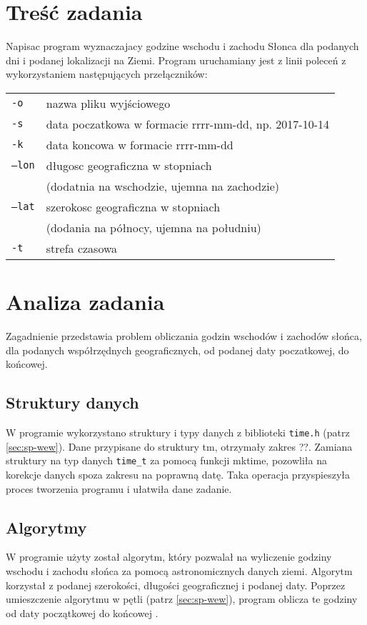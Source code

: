 \documentclass[12pt,a4paper]{article}
\begin{document}
\section{Treść zadania}
Napisac program wyznaczajacy godzine wschodu i zachodu Słonca dla podanych dni i podanej lokalizacji
na Ziemi.
Program uruchamiany jest z linii poleceń z wykorzystaniem następujących przełączników:
 
\begin{tabular}{ll}
\texttt{-o}  & nazwa pliku wyjściowego\\
\texttt{-s}  & data poczatkowa w formacie rrrr-mm-dd, np. 2017-10-14\\
\texttt{-k}  & data koncowa w formacie rrrr-mm-dd\\
\texttt{--lon}  & długosc geograficzna w stopniach\\
\texttt{} &(dodatnia na wschodzie, ujemna na zachodzie)\\
\texttt{--lat}  & szerokosc geograficzna w stopniach \\
\texttt{} &(dodania na północy, ujemna na południu)\\
\texttt{-t}  & strefa czasowa\\
\end{tabular}

\section{Analiza zadania}


Zagadnienie przedstawia problem obliczania godzin wschodów i zachodów słońca, dla podanych współrzędnych geograficznych,
od podanej daty poczatkowej, do końcowej.

\subsection{Struktury danych}
W programie wykorzystano struktury i typy danych z biblioteki \texttt{time.h} (patrz \ref{sec:sp-wew}). Dane przypisane do struktury tm, otrzymały zakres ??.  
Zamiana struktury na typ danych \lstinline|time_t| za pomocą funkcji mktime, pozowliła na korekcje danych spoza zakresu na poprawną datę.
Taka operacja przyspieszyła proces tworzenia programu i ułatwiła dane zadanie.


\subsection{Algorytmy}
W programie użyty został algorytm, który pozwalał na wyliczenie godziny wschodu i zachodu słońca za pomocą astronomicznych danych ziemi. Algorytm korzystał z podanej szerokości, długości geograficznej i podanej daty. Poprzez umieszczenie algorytmu  w pętli (patrz \ref{sec:sp-wew}), program oblicza te godziny od daty początkowej do końcowej . 
\end{document}
